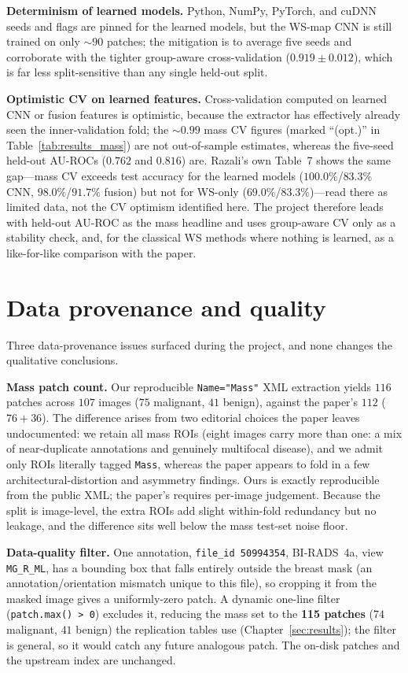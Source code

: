 \textbf{Determinism of learned models.} Python, NumPy, PyTorch, and cuDNN seeds and flags
are pinned for the learned models, but the WS-map CNN is still trained on only ${\sim}90$
patches; the mitigation is to average five seeds and corroborate with the tighter
group-aware cross-validation ($0.919 \pm 0.012$), which is far less split-sensitive than any
single held-out split.

\textbf{Optimistic CV on learned features.} Cross-validation computed on learned CNN
or fusion features is optimistic, because the extractor has effectively already seen the
inner-validation fold; the ${\sim}0.99$ mass CV figures (marked ``(opt.)'' in
Table~\ref{tab:results_mass}) are not out-of-sample estimates, whereas the five-seed
held-out AU-ROCs ($0.762$ and $0.816$) are. Razali's own Table~7 shows the same gap---mass CV exceeds test accuracy for the learned models ($100.0\%$/$83.3\%$ CNN, $98.0\%$/$91.7\%$ fusion) but not for WS-only ($69.0\%$/$83.3\%$)---read there as limited data, not the CV optimism identified here. The project therefore leads with held-out AU-ROC
as the mass headline and uses group-aware CV only as a stability check, and, for the
classical WS methods where nothing is learned, as a like-for-like comparison with the paper.

\section{Data provenance and quality}

Three data-provenance issues surfaced during the project, and none changes the qualitative conclusions.

\textbf{Mass patch count.} \label{sec:mass_count_discussion} Our reproducible \texttt{Name="Mass"} XML extraction yields $116$
patches across $107$ images ($75$ malignant, $41$ benign), against the paper's $112$
($76+36$). The difference arises from two editorial choices the paper leaves undocumented:
we retain all mass ROIs (eight images carry more than one: a mix of near-duplicate
annotations and genuinely multifocal disease), and we admit only ROIs literally tagged
\texttt{Mass}, whereas the paper appears to fold in a few architectural-distortion and
asymmetry findings. Ours is exactly reproducible from the public XML; the paper's requires
per-image judgement. Because the split is image-level, the extra ROIs add slight within-fold
redundancy but no leakage, and the difference sits well below the mass test-set noise floor.

\textbf{Data-quality filter.} \label{sec:mass_quality_filter} One annotation,
\texttt{file\_id 50994354}, BI-RADS~4a, view \texttt{MG\_R\_ML}, has a bounding box that
falls entirely outside the breast mask (an annotation/orientation mismatch unique to this
file), so cropping it from the masked image gives a uniformly-zero patch. A dynamic one-line
filter (\texttt{patch.max() > 0}) excludes it, reducing the mass set to the \textbf{115
patches} ($74$ malignant, $41$ benign) the replication tables use (Chapter~\ref{sec:results});
the filter is general, so it would catch any future analogous patch. The on-disk patches and
the upstream index are unchanged.

